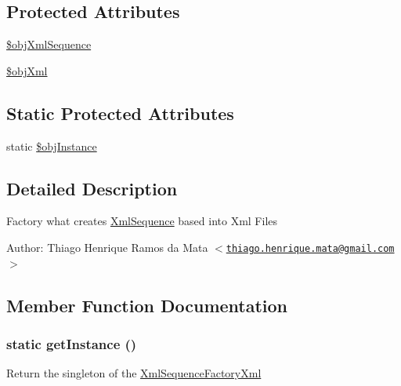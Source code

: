 \subsection*{Protected Attributes}
\begin{CompactItemize}
\item 
\hyperlink{class_xml_sequence_factory_xml_eefa469c1b13fe1fec040c910b720034}{\$objXmlSequence}
\item 
\hyperlink{class_xml_sequence_factory_xml_bc4e6de2df0815964fa9983816b76475}{\$objXml}
\end{CompactItemize}
\subsection*{Static Protected Attributes}
\begin{CompactItemize}
\item 
static \hyperlink{class_xml_sequence_factory_xml_917d057900327b25608ed26c927eac3b}{\$objInstance}
\end{CompactItemize}


\subsection{Detailed Description}
Factory what creates \hyperlink{class_xml_sequence}{XmlSequence} based into Xml Files \begin{Desc}
\item[Author:]Thiago Henrique Ramos da Mata $<$\href{mailto:thiago.henrique.mata@gmail.com}{\tt thiago.henrique.mata@gmail.com}$>$ \end{Desc}


\subsection{Member Function Documentation}
\hypertarget{class_xml_sequence_factory_xml_c93fbec81f07e5d15f80db907e63dc10}{
\subsubsection[{getInstance}]{\setlength{\rightskip}{0pt plus 5cm}static getInstance ()}}
\label{class_xml_sequence_factory_xml_c93fbec81f07e5d15f80db907e63dc10}


Return the singleton of the \hyperlink{class_xml_sequence_factory_xml}{XmlSequenceFactoryXml}

